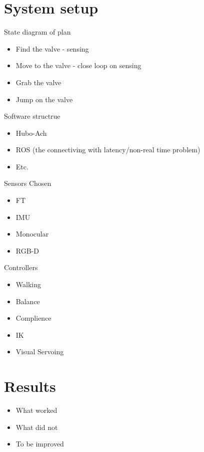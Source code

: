 \section{System setup}

State diagram of plan
\begin{itemize}
\item Find the valve - sensing
\item Move to the valve - close loop on sensing
\item Grab the valve
\item Jump on the valve
\end{itemize}

Software structrue
\begin{itemize}
\item Hubo-Ach
\item ROS (the connectiving with latency/non-real time problem)

\item Etc.
\end{itemize}


Sensors Chosen
\begin{itemize}
\item FT
\item IMU
\item Monocular
\item RGB-D
\end{itemize}

Controllers
\begin{itemize}
\item Walking
\item Balance
\item Complience
\item IK
\item Visual Servoing
\end{itemize}

\section{Results}\label{sec:results}
\begin{itemize}
\item What worked
\item What did not
\item To be improved
\end{itemize}

